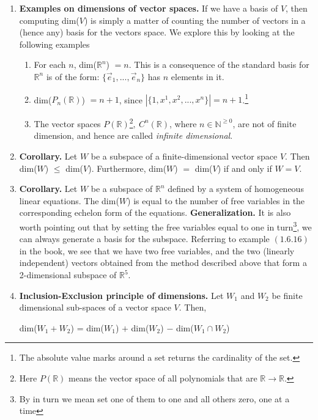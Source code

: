 \documentclass[oneside, 12pt]{book}
\newcommand{\settag}[1]{\renewcommand{\theenumi}{#1}}
\newcommand{\R}{\mathbb{R}}
\newcommand{\tbf}[1]{\textbf{#1}}
\newcommand{\tit}[1]{\textit{#1}}
\begin{document}
\begin{enumerate}
        \settag{1.6.13}
        \item \tbf{Examples on dimensions of vector spaces. }If we have a basis of $V$, then computing dim($V$) is simply a matter of counting the number of vectors in a (hence any) basis for the vectors space. We explore this by looking at the following examples
        \begin{enumerate}
            \item For each $n$, dim($\R^n$) $=n$. This is a consequence of the standard basis for $\R^n$ is of the form: $\{\vec{e}_1, ..., \vec{e}_n\}$ has $n$ elements in it.
            \item dim($P_n(\R)$) $=n+1$, since $|\{1, x^1, x^2, ..., x^n\}|=n+1$.\footnote{The absolute value marks around a set returns the cardinality of the set.}
            \item The vector spaces $P(\R)$\footnote{Here $P(\R)$ means the vector space of all polynomials that are $\R \xrightarrow{} \R$.}$,~C^n(\R)$, where $n\in \mathbb{N}^{\geq 0}$, are not of finite dimension, and hence are called \tit{infinite dimensional}.
        \end{enumerate}
        
        \settag{1.6.14}
        \item \tbf{Corollary. }Let $W$ be a subspace of a finite-dimensional vector space $V$. Then dim($W$) $\leq$ dim($V$). Furthermore, dim($W$) $=$ dim($V$) if and only if $W=V$.
        
        \settag{1.6.15}
        \item \tbf{Corollary. }Let $W$ be a subspace of $\R^n$ defined by a system of homogeneous linear equations. The dim($W$) is equal to the number of free variables in the corresponding echelon form of the equations.\newline
        \tbf{Generalization.} It is also worth pointing out that by setting the free variables equal to one in turn\footnote{By in turn we mean set one of them to one and all others zero, one at a time}, we can always generate a basis for the subspace. Referring to example $(1.6.16)$ in the book, we see that we have two free variables, and the two (linearly independent) vectors obtained from the method described above that form a 2-dimensional subspace of $\R^5$. 
        
        
        \settag{1.6.18}
        \item \tbf{Inclusion-Exclusion principle of dimensions.} Let $W_1$ and $W_2$ be finite dimensional sub-spaces of a vector space $V$. Then,
        \begin{center}
            dim($W_1+W_2$) = dim($W_1$) $+$ dim($W_2$) $-$ dim($W_1\cap W_2$)
        \end{center}
        
        
    \end{enumerate}
    
\end{document}

